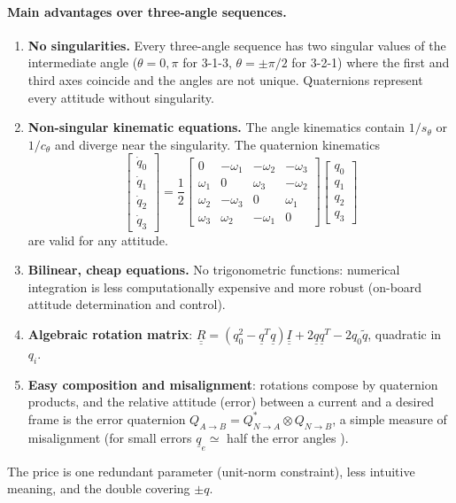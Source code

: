 \paragraph{Main advantages over three-angle sequences.}
\begin{enumerate}
\item \textbf{No singularities.} Every three-angle sequence has two singular values of the intermediate angle ($\theta=0,\pi$ for 3-1-3,
$\theta=\pm\pi/2$ for 3-2-1) where the first and third axes coincide and the angles are not unique. Quaternions represent every
attitude without singularity.
\item \textbf{Non-singular kinematic equations.} The angle kinematics contain $1/s_\theta$ or $1/c_\theta$ and diverge near the singularity.
The quaternion kinematics
\begin{equation}
\begin{bmatrix}\dot q_0\\ \dot q_1\\ \dot q_2\\ \dot q_3\end{bmatrix}=\frac12
\begin{bmatrix}0&-\omega_1&-\omega_2&-\omega_3\\ \omega_1&0&\omega_3&-\omega_2\\ \omega_2&-\omega_3&0&\omega_1\\ \omega_3&\omega_2&-\omega_1&0\end{bmatrix}
\begin{bmatrix}q_0\\ q_1\\ q_2\\ q_3\end{bmatrix}
\end{equation}
are valid for any attitude.
\item \textbf{Bilinear, cheap equations.} No trigonometric functions: numerical integration is less computationally expensive and more
robust (on-board attitude determination and control).
\item \textbf{Algebraic rotation matrix}: $\underline{\underline R}=(q_0^2-\underline q^T\underline q)\underline{\underline I}+2\underline q\underline q^T-2q_0\tilde q$, quadratic in $q_i$.
\item \textbf{Easy composition and misalignment}: rotations compose by quaternion products, and the relative attitude (error) between a
current and a desired frame is the error quaternion $Q_{A\to B}=Q^*_{N\to A}\otimes Q_{N\to B}$, a simple measure of misalignment
(for small errors $\underline q_e\simeq$ half the error angles \notinnotes).
\end{enumerate}
The price is one redundant parameter (unit-norm constraint), less intuitive meaning, and the double covering $\pm q$.

